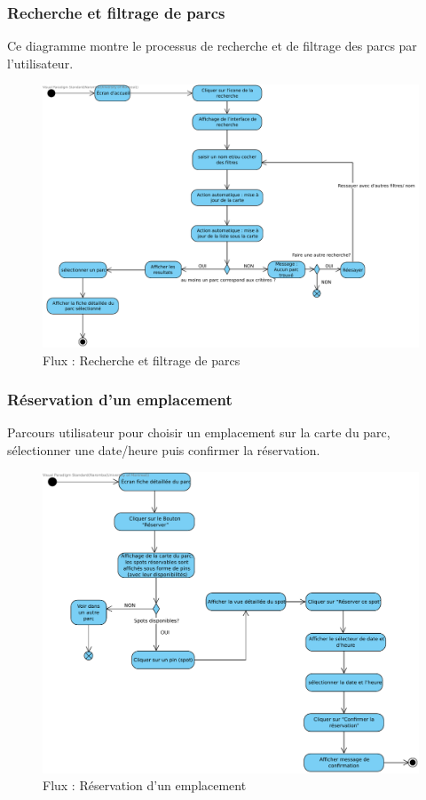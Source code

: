 \documentclass[12pt,a4paper]{article}
\begin{document}
\subsubsection{Recherche et filtrage de parcs}

Ce diagramme montre le processus de recherche et de filtrage des parcs par l'utilisateur.

\begin{figure}[h!]
  \centering
  \includegraphics[width=0.9\linewidth]{attachments/Recherche_Filtrage_Parcs.pdf}
  \caption{Flux : Recherche et filtrage de parcs}
\end{figure}

\subsubsection{Réservation d'un emplacement}

Parcours utilisateur pour choisir un emplacement sur la carte du parc, sélectionner une date/heure puis confirmer la réservation.

\begin{figure}[h!]
  \centering
  \includegraphics[width=0.9\linewidth]{attachments/Reservation_d_un_emplacement.pdf}
  \caption{Flux : Réservation d'un emplacement}
\end{figure}
\end{document}

